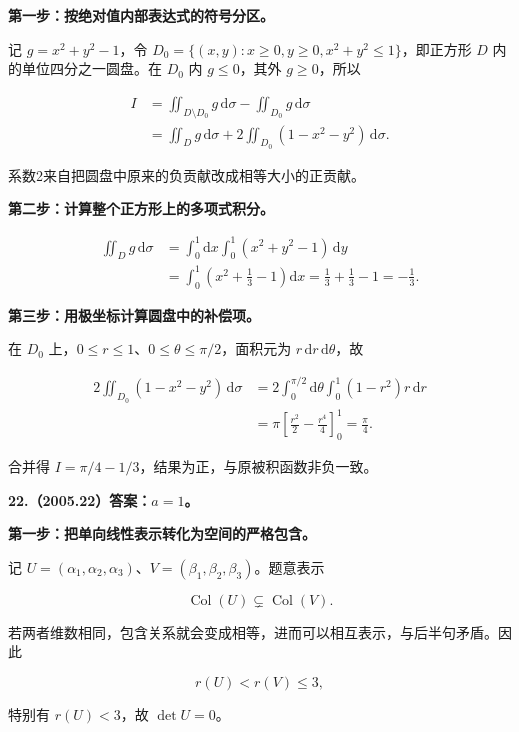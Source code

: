\documentclass[UTF8,11pt,fontset=windows]{ctexart}
\begin{document}
\textbf{第一步：按绝对值内部表达式的符号分区。}

记 $g=x^2+y^2-1$，令 $D_0=\{(x,y):x\ge0,y\ge0,x^2+y^2\le1\}$，即正方形 $D$ 内的单位四分之一圆盘。在 $D_0$ 内 $g\le0$，其外 $g\ge0$，所以

$$
\begin{aligned}
I&=\iint_{D\setminus D_0}g\,\mathrm d\sigma-\iint_{D_0}g\,\mathrm d\sigma\\
 &=\iint_Dg\,\mathrm d\sigma+2\iint_{D_0}(1-x^2-y^2)\,\mathrm d\sigma.
\end{aligned}
$$

系数2来自把圆盘中原来的负贡献改成相等大小的正贡献。

\textbf{第二步：计算整个正方形上的多项式积分。}

$$
\begin{aligned}
\iint_Dg\,\mathrm d\sigma
 &=\int_0^1\mathrm dx\int_0^1(x^2+y^2-1)\,\mathrm dy\\
 &=\int_0^1\left(x^2+\frac13-1\right)\mathrm dx
 =\frac13+\frac13-1=-\frac13.
\end{aligned}
$$

\textbf{第三步：用极坐标计算圆盘中的补偿项。}

在 $D_0$ 上，$0\le r\le1$、$0\le\theta\le\pi/2$，面积元为 $r\,\mathrm dr\,\mathrm d\theta$，故

$$
\begin{aligned}
2\iint_{D_0}(1-x^2-y^2)\,\mathrm d\sigma
 &=2\int_0^{\pi/2}\mathrm d\theta\int_0^1(1-r^2)r\,\mathrm dr\\
 &=\pi\left[\frac{r^2}{2}-\frac{r^4}{4}\right]_0^1=\frac\pi4.
\end{aligned}
$$

合并得 $\boxed{I=\pi/4-1/3}$，结果为正，与原被积函数非负一致。

\clearpage

\textbf{22.（2005.22）答案：$a=1$。}

\textbf{第一步：把单向线性表示转化为空间的严格包含。}

记 $U=(\alpha_1,\alpha_2,\alpha_3)$、$V=(\beta_1,\beta_2,\beta_3)$。题意表示

$$
\operatorname{Col}(U)\subsetneq\operatorname{Col}(V).
$$

若两者维数相同，包含关系就会变成相等，进而可以相互表示，与后半句矛盾。因此

$$
r(U)<r(V)\le3,
$$

特别有 $r(U)<3$，故 $\det U=0$。
\end{document}

